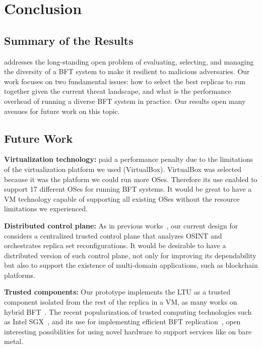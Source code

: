 \chapter{Conclusion}
\label{chap:conclusion}

\section{Summary of the Results}
\system addresses the long-standing open problem of evaluating, selecting, and managing the diversity of a BFT system to make it resilient to malicious adversaries.
Our work focuses on two fundamental issues: how to select the best replicas to run together given the current threat landscape, and what is the performance overhead of running a diverse BFT system in practice.
Our results open many avenues for future work on this topic.

\section{Future Work}

\textbf{Virtualization technology:}
\system paid a performance penalty due to the limitations of the virtualization platform we used (VirtualBox).
VirtualBox was selected because it was the platform we could run more OSes.
Therefore its use enabled \system to support 17 different OSes for running BFT systems.
It would be great to have a VM technology capable of supporting all existing OSes without the resource limitations we experienced.

\textbf{Distributed control plane:}
As in previous works~\cite{Roeder:2010,Platania:2014}, our current design for \system considers a centralized trusted control plane that analyzes OSINT and orchestrates replica set reconfigurations.
It would be desirable to have a distributed version of such control plane, not only for improving its dependability but also to support the existence of multi-domain applications, such as blockchain platforms.

\textbf{Trusted components:}
Our prototype implements the LTU as a trusted component isolated from the rest of the replica in a VM, as many works on hybrid BFT~\cite{Veronese:2013,Roeder:2010,Platania:2014,Sousa:2010,Distler:2011}.
The recent popularization of trusted computing technologies such as Intel SGX~\cite{sgx}, and its use for implementing efficient BFT replication~\cite{Behl:2017}, open interesting possibilities for using novel hardware to support services like \system on bare metal.

